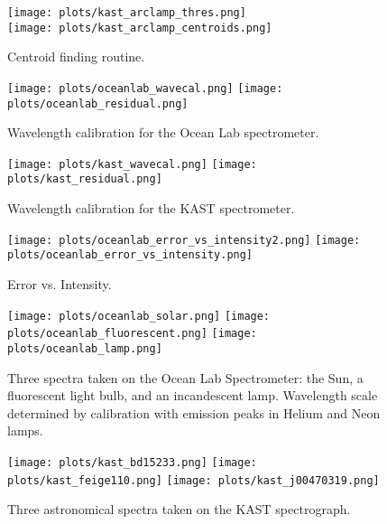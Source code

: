 \documentclass[preprint]{aastex62}
\begin{document}
\begin{figure}[]
\begin{center}
\texttt{[image: plots/kast\_arclamp\_thres.png]} \\
\texttt{[image: plots/kast\_arclamp\_centroids.png]} 
\caption{Centroid finding routine.}
\end{center}
\end{figure}

\begin{figure}[]
\begin{center}
\texttt{[image: plots/oceanlab\_wavecal.png]}
\texttt{[image: plots/oceanlab\_residual.png]}
\caption{Wavelength calibration for the Ocean Lab spectrometer.}
\end{center}
\end{figure}

\begin{figure}[]
\begin{center}
\texttt{[image: plots/kast\_wavecal.png]}
\texttt{[image: plots/kast\_residual.png]}
\caption{Wavelength calibration for the KAST spectrometer.}
\end{center}
\end{figure}

\begin{figure}[]
\begin{center}
\texttt{[image: plots/oceanlab\_error\_vs\_intensity2.png]}
\texttt{[image: plots/oceanlab\_error\_vs\_intensity.png]}
\caption{Error vs. Intensity.}
\end{center}
\end{figure}

\begin{figure}[]
\begin{center}
\texttt{[image: plots/oceanlab\_solar.png]}
\texttt{[image: plots/oceanlab\_fluorescent.png]}
\texttt{[image: plots/oceanlab\_lamp.png]}
\caption{Three spectra taken on the Ocean Lab Spectrometer: the Sun, a fluorescent light bulb, and an incandescent lamp. Wavelength scale determined by calibration with emission peaks in Helium and Neon lamps.}
\end{center}
\end{figure}

\begin{figure}[]
\begin{center}
\texttt{[image: plots/kast\_bd15233.png]}
\texttt{[image: plots/kast\_feige110.png]}
\texttt{[image: plots/kast\_j00470319.png]}
\caption{Three astronomical spectra taken on the KAST spectrograph.}
\end{center}
\end{figure}
\end{document}
